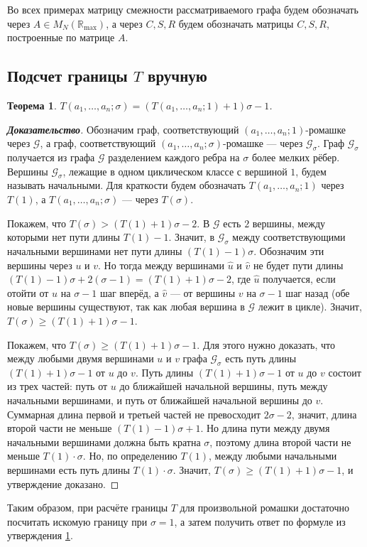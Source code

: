 \documentclass[12pt]{article}
\newtheorem{theorem}{Теорема}[section]
\begin{document}
Во всех примерах матрицу смежности рассматриваемого графа будем обозначать через $A \in M_N(\mathbb{R}_{\max})$, а через $C, S, R$ будем обозначать матрицы $C, S, R$, построенные по матрице $A$.

\subsection{Подсчет границы $T$ вручную}
\begin{theorem}
\label{everyKFormula}
$T(a_1, \dots, a_n; \sigma) = (T(a_1, \dots, a_n; 1) + 1)\sigma - 1$.
\end{theorem}
\begin{proof}[\textbf{Доказательство}] 
Обозначим граф, соответствующий $(a_1, \dots, a_n; 1)$-ромашке через $\mathcal{G}$, а граф, соответствующий $(a_1, \dots, a_n; \sigma)$-ромашке --- через $\mathcal{G}_\sigma$. Граф $\mathcal{G}_\sigma$ получается из графа $\mathcal{G}$ разделением каждого ребра на $\sigma$ более мелких рёбер. Вершины $\mathcal{G}_\sigma$, лежащие в одном циклическом классе с вершиной $1$, будем называть начальными. Для краткости будем обозначать $T(a_1, \dots, a_n; 1)$ через $T(1)$, а $T(a_1, \dots, a_n; \sigma)$ --- через $T(\sigma)$.

Покажем, что $T(\sigma) > (T(1) + 1)\sigma - 2$. В $\mathcal{G}$ есть $2$ вершины, между которыми нет пути длины $T(1) - 1$. Значит, в $\mathcal{G}_\sigma$ между соответствующими начальными вершинами нет пути длины $(T(1) - 1)\sigma$. Обозначим эти вершины через $u$ и $v$. Но тогда между вершинами $\hat{u}$ и $\hat{v}$ не будет пути длины $(T(1) - 1)\sigma + 2(\sigma - 1) = (T(1) + 1)\sigma - 2$, где $\hat{u}$ получается, если отойти от $u$ на $\sigma - 1$  шаг вперёд, а $\hat{v}$ --- от вершины $v$ на $\sigma - 1$ шаг назад (обе новые вершины существуют, так как любая вершина в $\mathcal{G}$ лежит в цикле). Значит, $T(\sigma) \ge (T(1) + 1)\sigma - 1$.

Покажем, что $T(\sigma) \ge (T(1) + 1)\sigma - 1$. Для этого нужно доказать, что между любыми двумя вершинами $u$ и $v$ графа $\mathcal{G}_\sigma$ есть путь длины $(T(1) + 1)\sigma - 1$ от $u$ до $v$. Путь длины $(T(1) + 1)\sigma - 1$ от $u$ до $v$ состоит из трех частей: путь от $u$ до ближайшей начальной вершины, путь между начальными вершинами, и путь от ближайшей начальной вершины до $v$. Суммарная длина первой и третьей частей не превосходит $2\sigma - 2$, значит, длина второй части не меньше $(T(1) - 1)\sigma + 1$. Но длина пути между двумя начальными вершинами должна быть кратна $\sigma$, поэтому длина второй части не меньше $T(1)\cdot \sigma$. Но, по определению $T(1)$, между любыми начальными вершинами есть путь длины $T(1)\cdot \sigma$. Значит, $T(\sigma) \ge (T(1) + 1)\sigma - 1$, и утверждение доказано.
\end{proof}
Таким образом, при расчёте границы $T$ для произвольной ромашки достаточно посчитать искомую границу при $\sigma = 1$, а затем получить ответ по формуле из утверждения \ref{everyKFormula}. 
\end{document}
